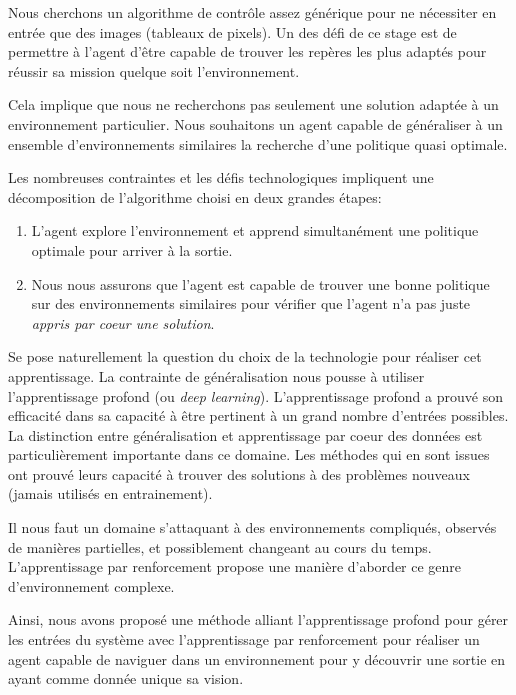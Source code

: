 Nous cherchons un algorithme de contrôle assez générique pour ne nécessiter en entrée que des images (tableaux de pixels). Un des défi de ce stage est de permettre à  l'agent d'être capable de trouver les repères les plus adaptés pour réussir sa mission quelque soit l'environnement.

Cela implique que nous ne recherchons pas seulement une solution adaptée à un environnement particulier. Nous souhaitons un agent capable de généraliser à un ensemble d'environnements similaires la recherche d'une politique quasi optimale. 

Les nombreuses contraintes et les défis technologiques impliquent une décomposition de l'algorithme choisi en deux grandes étapes:

\begin{enumerate}
    \item L'agent explore l'environnement et apprend simultanément une politique optimale pour arriver à la sortie.
    \item Nous nous assurons que l'agent est capable de trouver une bonne politique sur des environnements similaires pour vérifier que l'agent n'a pas juste \emph{appris par coeur une solution}.
\end{enumerate}

Se pose naturellement la question du choix de la technologie pour réaliser cet apprentissage.
La contrainte de généralisation nous pousse à utiliser l'apprentissage profond (ou \emph{deep learning}). L'apprentissage profond a prouvé son efficacité dans sa capacité à être pertinent à un grand nombre d'entrées possibles.  
La distinction entre généralisation et apprentissage par coeur des données est particulièrement importante dans ce domaine. Les méthodes qui en sont issues ont prouvé leurs capacité à trouver des solutions à des problèmes nouveaux (jamais utilisés en entrainement).

Il nous faut un domaine s'attaquant à des environnements compliqués, observés de manières partielles, et possiblement changeant au cours du temps. L'apprentissage par renforcement propose une manière d'aborder ce genre d'environnement complexe. 

Ainsi, nous avons proposé une méthode alliant l'apprentissage profond pour gérer les entrées du système avec l'apprentissage par renforcement pour réaliser un agent capable de naviguer dans un environnement pour y découvrir une sortie en ayant comme donnée unique sa vision.
